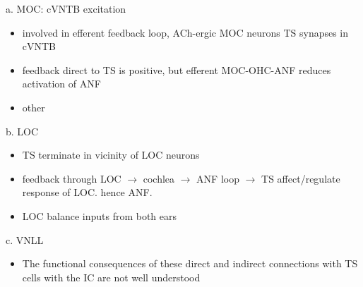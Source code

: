 a. MOC: cVNTB excitation 

\begin{itemize}
\item involved in efferent feedback loop, ACh-ergic MOC neurons TS synapses in cVNTB \citep{WarrBeck:1996,Warr:1992,Warr:1982,VeneciaLibermanEtAl:2005,ThompsonThompson:1991,SmithJorisEtAl:1993}
\item feedback direct to TS is positive, but efferent MOC-OHC-ANF reduces activation of ANF \citep{WarrenLiberman:1989,WiederholdKiang:1970}
\item other \citep{RobertsonMulders:2000,WinterRobertsonEtAl:1989}
\end{itemize}

b. LOC

\begin{itemize}
\item TS terminate in vicinity of LOC neurons \citep{Warr:1982,ThompsonThompson:1988,ThompsonThompson:1991,DoucetRyugo:2003}
\item feedback through LOC $\rightarrow$ cochlea $\rightarrow$ ANF loop $\rightarrow$ TS affect/regulate response of LOC. hence ANF.
\item LOC balance inputs from both ears \citep{DarrowMaisonEtAl:2006}
\end{itemize}

c. VNLL

\begin{itemize}
\item The functional consequences of these direct and indirect connections with TS cells with the IC are not well understood
\end{itemize}








